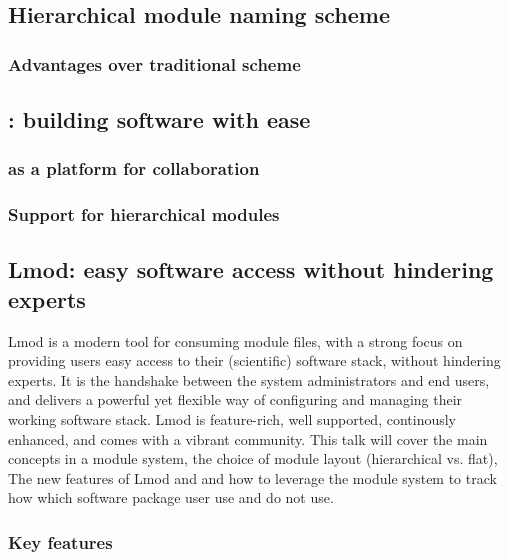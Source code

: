 
\subsection{Hierarchical module naming scheme}

\subsubsection{Advantages over traditional scheme}




\subsection{\easybuild{}: building software with ease}

\subsubsection{\easybuild{} as a platform for collaboration}

\subsubsection{Support for hierarchical modules}



\subsection{Lmod: easy software access without hindering experts}

Lmod is a modern tool for consuming module files, with a strong focus on providing users
easy access to their (scientific) software stack, without hindering experts. It is the
handshake between the system administrators and end users, and delivers a powerful yet
flexible way of configuring and managing their working software stack. Lmod is feature-rich,
well supported, continously enhanced, and comes with a vibrant
community.   This talk will cover the main concepts in a module
system, the choice of module layout (hierarchical vs. flat),  The
new features of Lmod and and how to leverage the module system to
track how which software package user use and do not use.


\subsubsection{Key features}

